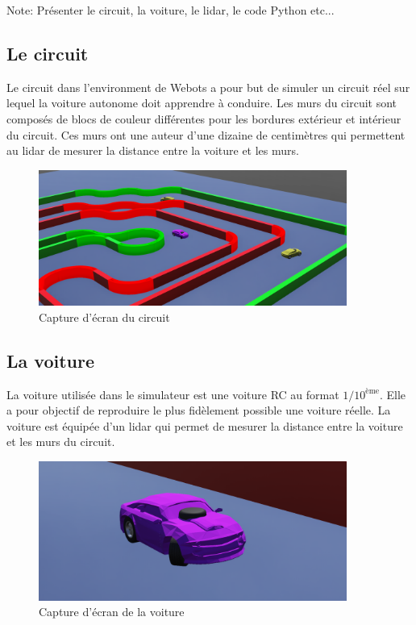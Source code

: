 \documentclass[french]{article}
\begin{document}
\noindent
Note: Présenter le circuit, la voiture, le lidar, le code Python etc...

\subsection{Le circuit}
Le circuit dans l'environment de Webots a pour but de simuler un circuit réel sur lequel la voiture autonome doit
apprendre à conduire. Les murs du circuit sont composés de blocs de couleur différentes pour les bordures extérieur et 
intérieur du circuit. Ces murs ont une auteur d'une dizaine de centimètres qui permettent au lidar de mesurer la distance
entre la voiture et les murs.

\begin{figure}[H]
    \centering
    \includegraphics[width=0.9\textwidth]{Images/Circuit.png}
    \caption{Capture d'écran du circuit}
\end{figure}

\subsection{La voiture}
La voiture utilisée dans le simulateur est une voiture RC au format $1/10^{\text{ème}}$. Elle a pour objectif de
reproduire le plus fidèlement possible une voiture réelle. La voiture est équipée d'un lidar qui permet de mesurer la
distance entre la voiture et les murs du circuit.

\begin{figure}[H]
    \centering
    \includegraphics[width=0.9\textwidth]{Images/Voiture.png}
    \caption{Capture d'écran de la voiture}
\end{figure}
\end{document}
